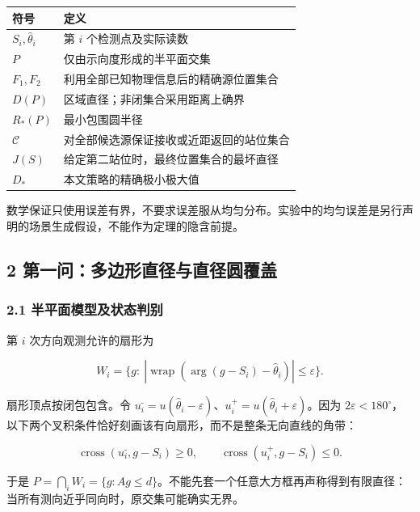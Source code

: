 \documentclass[
  11pt,
  fontset=none]{ctexart}
\newcounter{none} %
\begin{document}
{\def\LTcaptype{none} %
\begin{longtable}[]{@{}ll@{}}
\toprule\noalign{}
符号 & 定义 \\
\midrule\noalign{}
\endhead
\bottomrule\noalign{}
\endlastfoot
\(S_i,\widehat\theta_i\) & 第 \(i\) 个检测点及实际读数 \\
\(P\) & 仅由示向度形成的半平面交集 \\
\(F_1,F_2\) & 利用全部已知物理信息后的精确源位置集合 \\
\(D(P)\) & 区域直径；非闭集合采用距离上确界 \\
\(R_{\text{*}}(P)\) & 最小包围圆半径 \\
\(\mathcal C\) & 对全部候选源保证接收或近距返回的站位集合 \\
\(J(S)\) & 给定第二站位时，最终位置集合的最坏直径 \\
\(D_{\text{*}}\) & 本文策略的精确极小极大值 \\
\end{longtable}
}

数学保证只使用误差有界，不要求误差服从均匀分布。实验中的均匀误差是另行声明的场景生成假设，不能作为定理的隐含前提。

\subsection{2
第一问：多边形直径与直径圆覆盖}\label{ux7b2cux4e00ux95eeux591aux8fb9ux5f62ux76f4ux5f84ux4e0eux76f4ux5f84ux5706ux8986ux76d6}

\subsubsection{2.1
半平面模型及状态判别}\label{ux534aux5e73ux9762ux6a21ux578bux53caux72b6ux6001ux5224ux522b}

第 \(i\) 次方向观测允许的扇形为

\[
W_i=\{g:\ |\operatorname{wrap}(\arg(g-S_i)-\widehat\theta_i)|\le\varepsilon\}.
\]

扇形顶点按闭包包含。令
\(u_i^{\text{-}}=u(\widehat\theta_i-\varepsilon)\)、\(u_i^{\text{+}}=u(\widehat\theta_i+\varepsilon)\)。因为
\(2\varepsilon<180^\circ\)，以下两个叉积条件恰好刻画该有向扇形，而不是整条无向直线的角带：

\[
\operatorname{cross}(u_i^{\text{-}},g-S_i)\ge0,\qquad
\operatorname{cross}(u_i^{\text{+}},g-S_i)\le0. \tag{1}
\]

于是
\(P=\bigcap_iW_i=\{g:Ag\le d\}\)。不能先套一个任意大方框再声称得到有限直径：当所有测向近乎同向时，原交集可能确实无界。
\end{document}
